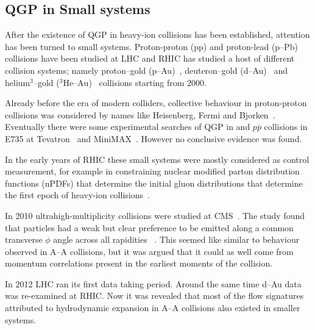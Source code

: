 
\subsection{QGP in Small systems}
\label{sec:smallsystem}
After the existence of QGP in heavy-ion collisions has been established, attention has been turned to small systems. Proton-proton (pp) and proton-lead (p--Pb) collisions have been studied at LHC and RHIC has studied a host of different collision systems; namely proton--gold (p--Au)~\cite{Aidala:2016vgl}, deuteron--gold (d--Au)~\cite{Adler:2003ii,Arsene:2003yk,Back:2003ns,Adams:2003im} and helium$^3$--gold ($^3\mbox{He--Au}$)~\cite{Adare:2015ctn} collisions starting from 2000. %

Already before the era of modern colliders, collective behaviour in proton-proton collisions was considered by names like Heisenberg, Fermi and Bjorken~\cite{Nagle:2018nvi}. Eventually there were some experimental searches of QGP in \pp and $p\bar p$ collisions in E735 at Tevatron~\cite{Alexopoulos:1993wt} and MiniMAX~\cite{Brooks:1999xy}. However no conclusive evidence was found. 

In the early years of RHIC these small systems were mostly considered as control measurement, for example in constraining nuclear modified parton distribution functions (nPDFs) that determine the initial gluon distributions that determine the first epoch of heavy-ion collisions~\cite{Shen:2015qta, Adare:2015lcd}. 

In 2010 ultrahigh-multiplicity \pp collisions were studied at CMS~\cite{Khachatryan:2010gv}. The study found that particles had a weak but clear preference to be emitted along a common transverse $\phi$ angle across all rapidities ~\cite{Salgado:2016jws}. This seemed like similar to behaviour observed in A--A collisions, but it was argued that it could as well come from momentum correlations present in the earliest moments of the collision.

In 2012 LHC ran its first \pPb data taking period. Around the same time d--Au data was re-examined at RHIC. Now it was revealed that most of the flow signatures attributed to hydrodynamic expansion in A--A collisions also existed in smaller systems.



